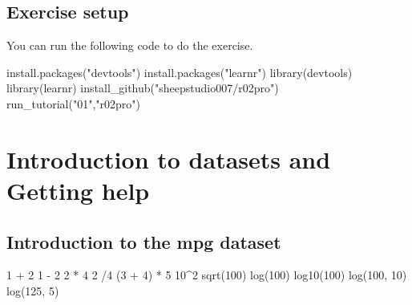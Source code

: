 \documentclass[
]{book}
\newenvironment{Shaded}{\begin{snugshade}}{\end{snugshade}}
\newcommand{\DecValTok}[1]{\textcolor[rgb]{0.00,0.00,0.81}{#1}}
\newcommand{\FunctionTok}[1]{\textcolor[rgb]{0.00,0.00,0.00}{#1}}
\newcommand{\NormalTok}[1]{#1}
\newcommand{\SpecialCharTok}[1]{\textcolor[rgb]{0.00,0.00,0.00}{#1}}
\newcommand{\StringTok}[1]{\textcolor[rgb]{0.31,0.60,0.02}{#1}}
\begin{document}
\hypertarget{exercise-setup-1}{%
\section{Exercise setup}\label{exercise-setup-1}}

You can run the following code to do the exercise.

\begin{Shaded}
\begin{Highlighting}[]
\FunctionTok{install.packages}\NormalTok{(}\StringTok{"devtools"}\NormalTok{)}
\FunctionTok{install.packages}\NormalTok{(}\StringTok{"learnr"}\NormalTok{)}
\FunctionTok{library}\NormalTok{(devtools)}
\FunctionTok{library}\NormalTok{(learnr)}
\FunctionTok{install\_github}\NormalTok{(}\StringTok{"sheepstudio007/r02pro"}\NormalTok{)}
\FunctionTok{run\_tutorial}\NormalTok{(}\StringTok{"01"}\NormalTok{,}\StringTok{"r02pro"}\NormalTok{)}
\end{Highlighting}
\end{Shaded}

\hypertarget{introduction-to-datasets-and-getting-help-1}{%
\chapter{Introduction to datasets and Getting help}\label{introduction-to-datasets-and-getting-help-1}}

\hypertarget{introduction-to-the-mpg-dataset-1}{%
\section{Introduction to the mpg dataset}\label{introduction-to-the-mpg-dataset-1}}

\begin{Shaded}
\begin{Highlighting}[]
\DecValTok{1} \SpecialCharTok{+} \DecValTok{2}
\DecValTok{1} \SpecialCharTok{{-}} \DecValTok{2}
\DecValTok{2} \SpecialCharTok{*} \DecValTok{4}
\DecValTok{2} \SpecialCharTok{/}\DecValTok{4}
\NormalTok{(}\DecValTok{3} \SpecialCharTok{+} \DecValTok{4}\NormalTok{) }\SpecialCharTok{*} \DecValTok{5}
\DecValTok{10}\SpecialCharTok{\^{}}\DecValTok{2}
\FunctionTok{sqrt}\NormalTok{(}\DecValTok{100}\NormalTok{)}
\FunctionTok{log}\NormalTok{(}\DecValTok{100}\NormalTok{)}
\FunctionTok{log10}\NormalTok{(}\DecValTok{100}\NormalTok{)}
\FunctionTok{log}\NormalTok{(}\DecValTok{100}\NormalTok{, }\DecValTok{10}\NormalTok{)}
\FunctionTok{log}\NormalTok{(}\DecValTok{125}\NormalTok{, }\DecValTok{5}\NormalTok{)}
\end{Highlighting}
\end{Shaded}
\end{document}
